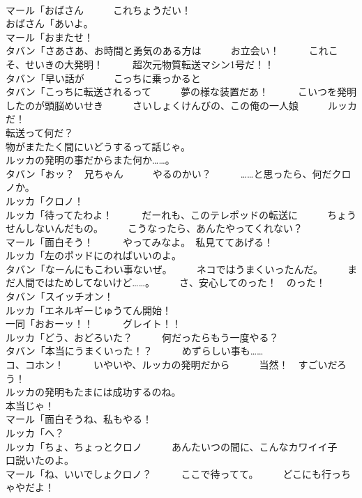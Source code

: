 \documentclass[8pt]{extreport}
\begin{document}
\begin{CJK}{UTF8}{min}
\\	マール「おばさん　　　これちょうだい！	
\\	おばさん「あいよ。	
\\	マール「おまたせ！	
\\	タバン「さあさあ、お時間と勇気のある方は　　　お立会い！　　　これこそ、せいきの大発明！　　　超次元物質転送マシン1号だ！！	
\\	タバン「早い話が　　　こっちに乗っかると	
\\	タバン「こっちに転送されるって　　　夢の様な装置だあ！　　　こいつを発明したのが頭脳めいせき　　　さいしょくけんびの、この俺の一人娘　　　ルッカだ！	
\\	転送って何だ？	
\\	物がまたたく間にいどうするって話じゃ。	
\\	ルッカの発明の事だからまた何か……。	
\\	タバン「おッ？　兄ちゃん　　　やるのかい？　　　……と思ったら、何だクロノか。	
\\	ルッカ「クロノ！	
\\	ルッカ「待ってたわよ！　　　だーれも、このテレポッドの転送に　　　ちょうせんしないんだもの。　　　こうなったら、あんたやってくれない？	
\\	マール「面白そう！　　　やってみなよ。　私見ててあげる！	
\\	ルッカ「左のポッドにのればいいのよ。	
\\	タバン「なーんにもこわい事ないぜ。　　　ネコではうまくいったんだ。　　　まだ人間ではためしてないけど……。　　　さ、安心してのった！　のった！	
\\	タバン「スイッチオン！	
\\	ルッカ「エネルギーじゅうてん開始！	
\\	一同「おおーッ！！　　　グレイト！！	
\\	ルッカ「どう、おどろいた？　　　何だったらもう一度やる？	
\\	タバン「本当にうまくいった！？　　　めずらしい事も……	
\\	コ、コホン！　　　いやいや、ルッカの発明だから　　　当然！　すごいだろう！	
\\	ルッカの発明もたまには成功するのね。	
\\	本当じゃ！	
\\	マール「面白そうね、私もやる！	
\\	ルッカ「へ？	
\\	ルッカ「ちょ、ちょっとクロノ　　　あんたいつの間に、こんなカワイイ子　　　口説いたのよ。	
\\	マール「ね、いいでしょクロノ？　　　ここで待ってて。　　　どこにも行っちゃやだよ！	

\end{CJK}
\end{document}
